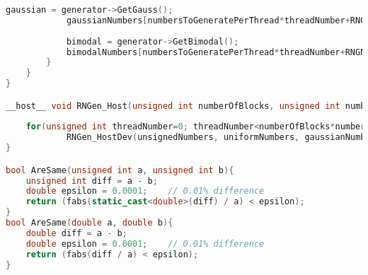 \begin{lstlisting}[language=C++, caption={\texttt{libraries/CoreLibraries/RandomGenerator/OutputTest.cu}}]
			gaussian = generator->GetGauss();
			gaussianNumbers[numbersToGeneratePerThread*threadNumber+RNGNumber] = gaussian;
			
			bimodal = generator->GetBimodal();
			bimodalNumbers[numbersToGeneratePerThread*threadNumber+RNGNumber] = bimodal;
		}
	}
}

__host__ void RNGen_Host(unsigned int numberOfBlocks, unsigned int numberOfThreadsPerBlock, unsigned int *unsignedNumbers, double *uniformNumbers, double *gaussianNumbers, double *bimodalNumbers, unsigned int totalNumbersToGenerate, unsigned int numbersToGeneratePerThread, unsigned int seed){
	
	for(unsigned int threadNumber=0; threadNumber<numberOfBlocks*numberOfThreadsPerBlock; ++threadNumber)
			RNGen_HostDev(unsignedNumbers, uniformNumbers, gaussianNumbers, bimodalNumbers, totalNumbersToGenerate, numbersToGeneratePerThread, seed, threadNumber);
}

bool AreSame(unsigned int a, unsigned int b){
	unsigned int diff = a - b;
	double epsilon = 0.0001;	// 0.01% difference
	return (fabs(static_cast<double>(diff) / a) < epsilon);
}
bool AreSame(double a, double b){
	double diff = a - b;
	double epsilon = 0.0001;	// 0.01% difference
	return (fabs(diff / a) < epsilon);	
}
\end{lstlisting}


